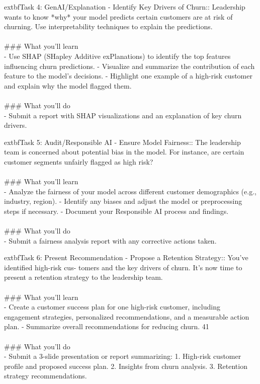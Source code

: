 \documentclass{article}
\begin{document}
	extbf{Task 4:} GenAI/Explanation - Identify Key Drivers of Churn:: Leadership wants to know *why* your model predicts certain customers are at risk of churning. Use interpretability techniques to explain the predictions. \\
 \\
### What you'll learn \\
- Use SHAP (SHapley Additive exPlanations) to identify the top features influencing churn predictions. - Visualize and summarize the contribution of each feature to the model’s decisions. - Highlight one example of a high-risk customer and explain why the model flagged them.  \\
 \\
### What you'll do \\
- Submit a report with SHAP visualizations and an explanation of key churn drivers.

	extbf{Task 5:} Audit/Responsible AI - Ensure Model Fairness:: The leadership team is concerned about potential bias in the model. For instance, are certain customer segments unfairly flagged as high risk? \\
 \\
### What you'll learn \\
- Analyze the fairness of your model across different customer demographics (e.g., industry, region). - Identify any biases and adjust the model or preprocessing steps if necessary. - Document your Responsible AI process and findings. \\
 \\
### What you'll do \\
- Submit a fairness analysis report with any corrective actions taken.

	extbf{Task 6:} Present Recommendation - Propose a Retention Strategy:: You’ve identified high-risk cus- tomers and the key drivers of churn. It’s now time to present a retention strategy to the leadership team. \\
 \\
### What you'll learn \\
- Create a customer success plan for one high-risk customer, including engagement strategies, personalized recommendations, and a measurable action plan. - Summarize overall recommendations for reducing churn. 41 \\
 \\
### What you'll do \\
- Submit a 3-slide presentation or report summarizing: 1. High-risk customer profile and proposed success plan. 2. Insights from churn analysis. 3. Retention strategy recommendations.
\end{document}
